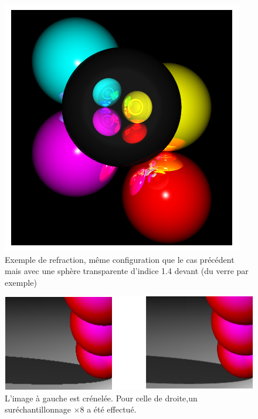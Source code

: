 \documentclass[10pt,a4paper]{article}
\begin{document}
\begin{figure}[hbtp]
\centering
\includegraphics[scale=0.6]{erefraction.png}
\caption{Exemple de refraction, même configuration que le cas précédent mais avec une sphère transparente d'indice 1.4 devant (du verre par exemple)} \label{erefraction}
\end{figure}


\begin{figure}
\begin{flushleft}
\includegraphics[scale=0.9]{anticrenelage.png}
\end{flushleft} \label{crenelage}
\caption{L'image à gauche est crénelée. Pour celle de droite,un suréchantillonnage $\times 8$ a été effectué.}
\end{figure}
\end{document}
